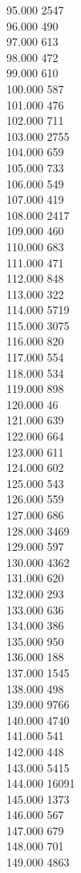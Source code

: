 { 95.000	2547 \\
 96.000	490 \\
 97.000	613 \\
 98.000	472 \\
 99.000	610 \\
 100.000	587 \\
 101.000	476 \\
 102.000	711 \\
 103.000	2755 \\
 104.000	659 \\
 105.000	733 \\
 106.000	549 \\
 107.000	419 \\
 108.000	2417 \\
 109.000	460 \\
 110.000	683 \\
 111.000	471 \\
 112.000	848 \\
 113.000	322 \\
 114.000	5719 \\
 115.000	3075 \\
 116.000	820 \\
 117.000	554 \\
 118.000	534 \\
 119.000	898 \\
 120.000	46 \\
 121.000	639 \\
 122.000	664 \\
 123.000	611 \\
 124.000	602 \\
 125.000	543 \\
 126.000	559 \\
 127.000	686 \\
 128.000	3469 \\
 129.000	597 \\
 130.000	4362 \\
 131.000	620 \\
 132.000	293 \\
 133.000	636 \\
 134.000	386 \\
 135.000	950 \\
 136.000	188 \\
 137.000	1545 \\
 138.000	498 \\
 139.000	9766 \\
 140.000	4740 \\
 141.000	541 \\
 142.000	448 \\
 143.000	5415 \\
 144.000	16091 \\
 145.000	1373 \\
 146.000	567 \\
 147.000	679 \\
 148.000	701 \\
 149.000	4863 \\
}
